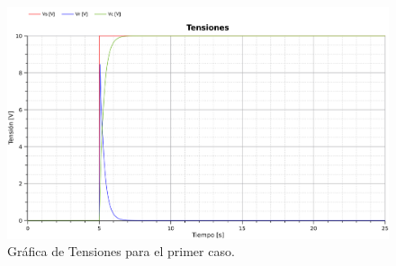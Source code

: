 \begin{figure}[H]
  \centering
  \label{gr:caso1:tensiones}
  \includegraphics[width=\textwidth]{modelica/graficas/1-tensiones}
  \caption{Gráfica de Tensiones para el primer caso.}
\end{figure}
